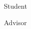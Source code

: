 \documentclass[a4paper,12pt]{article}
\begin{document}
\vfill

\begin{center}

  Student\hspace{0.5cm} \makebox[2in]{\hrulefill}
  
  \vspace{0.5cm}
  
  Advisor\hspace{0.5cm} \makebox[2in]{\hrulefill}

    
\end{center}
\end{document}
